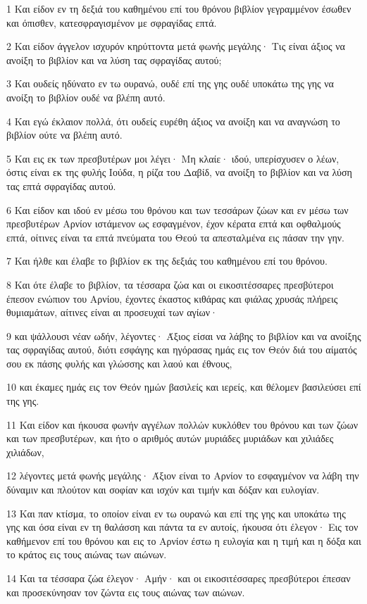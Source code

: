 \par 1 Και είδον εν τη δεξιά του καθημένου επί του θρόνου βιβλίον γεγραμμένον έσωθεν και όπισθεν, κατεσφραγισμένον με σφραγίδας επτά.
\par 2 Και είδον άγγελον ισχυρόν κηρύττοντα μετά φωνής μεγάλης· Τις είναι άξιος να ανοίξη το βιβλίον και να λύση τας σφραγίδας αυτού;
\par 3 Και ουδείς ηδύνατο εν τω ουρανώ, ουδέ επί της γης ουδέ υποκάτω της γης να ανοίξη το βιβλίον ουδέ να βλέπη αυτό.
\par 4 Και εγώ έκλαιον πολλά, ότι ουδείς ευρέθη άξιος να ανοίξη και να αναγνώση το βιβλίον ούτε να βλέπη αυτό.
\par 5 Και εις εκ των πρεσβυτέρων μοι λέγει· Μη κλαίε· ιδού, υπερίσχυσεν ο λέων, όστις είναι εκ της φυλής Ιούδα, η ρίζα του Δαβίδ, να ανοίξη το βιβλίον και να λύση τας επτά σφραγίδας αυτού.
\par 6 Και είδον και ιδού εν μέσω του θρόνου και των τεσσάρων ζώων και εν μέσω των πρεσβυτέρων Αρνίον ιστάμενον ως εσφαγμένον, έχον κέρατα επτά και οφθαλμούς επτά, οίτινες είναι τα επτά πνεύματα του Θεού τα απεσταλμένα εις πάσαν την γην.
\par 7 Και ήλθε και έλαβε το βιβλίον εκ της δεξιάς του καθημένου επί του θρόνου.
\par 8 Και ότε έλαβε το βιβλίον, τα τέσσαρα ζώα και οι εικοσιτέσσαρες πρεσβύτεροι έπεσον ενώπιον του Αρνίου, έχοντες έκαστος κιθάρας και φιάλας χρυσάς πλήρεις θυμιαμάτων, αίτινες είναι αι προσευχαί των αγίων·
\par 9 και ψάλλουσι νέαν ωδήν, λέγοντες· Άξιος είσαι να λάβης το βιβλίον και να ανοίξης τας σφραγίδας αυτού, διότι εσφάγης και ηγόρασας ημάς εις τον Θεόν διά του αίματός σου εκ πάσης φυλής και γλώσσης και λαού και έθνους,
\par 10 και έκαμες ημάς εις τον Θεόν ημών βασιλείς και ιερείς, και θέλομεν βασιλεύσει επί της γης.
\par 11 Και είδον και ήκουσα φωνήν αγγέλων πολλών κυκλόθεν του θρόνου και των ζώων και των πρεσβυτέρων, και ήτο ο αριθμός αυτών μυριάδες μυριάδων και χιλιάδες χιλιάδων,
\par 12 λέγοντες μετά φωνής μεγάλης· Άξιον είναι το Αρνίον το εσφαγμένον να λάβη την δύναμιν και πλούτον και σοφίαν και ισχύν και τιμήν και δόξαν και ευλογίαν.
\par 13 Και παν κτίσμα, το οποίον είναι εν τω ουρανώ και επί της γης και υποκάτω της γης και όσα είναι εν τη θαλάσση και πάντα τα εν αυτοίς, ήκουσα ότι έλεγον· Εις τον καθήμενον επί του θρόνου και εις το Αρνίον έστω η ευλογία και η τιμή και η δόξα και το κράτος εις τους αιώνας των αιώνων.
\par 14 Και τα τέσσαρα ζώα έλεγον· Αμήν· και οι εικοσιτέσσαρες πρεσβύτεροι έπεσαν και προσεκύνησαν τον ζώντα εις τους αιώνας των αιώνων.


